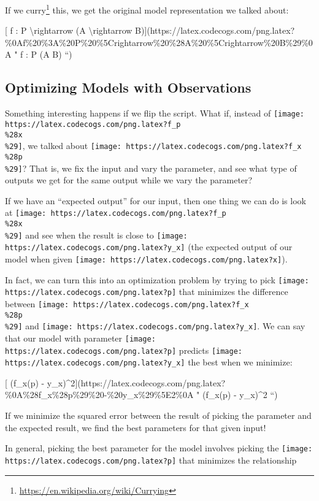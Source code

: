 \documentclass[]{article}
\renewcommand{\href}[2]{#2\footnote{\url{#1}}}
\begin{document}
If we \href{https://en.wikipedia.org/wiki/Currying}{curry} this, we get the
original model representation we talked about:

{[} f : P \textbackslash{}rightarrow (A \textbackslash{}rightarrow
B){]}(https://latex.codecogs.com/png.latex?\%0Af\%20\%3A\%20P\%20\%5Crightarrow\%20\%28A\%20\%5Crightarrow\%20B\%29\%0A
" f : P \rightarrow (A \rightarrow B) ``)

\hypertarget{optimizing-models-with-observations}{%
\subsection{Optimizing Models with
Observations}\label{optimizing-models-with-observations}}

Something interesting happens if we flip the script. What if, instead of
\texttt{[image: https://latex.codecogs.com/png.latex?f\_p\\\%28x\\\%29]}, we talked
about \texttt{[image: https://latex.codecogs.com/png.latex?f\_x\\\%28p\\\%29]}? That
is, we fix the input and vary the parameter, and see what type of outputs we get
for the same output while we vary the parameter?

If we have an ``expected output'' for our input, then one thing we can do is
look at \texttt{[image: https://latex.codecogs.com/png.latex?f\_p\\\%28x\\\%29]} and
see when the result is close to
\texttt{[image: https://latex.codecogs.com/png.latex?y\_x]} (the expected output
of our model when given
\texttt{[image: https://latex.codecogs.com/png.latex?x]}).

In fact, we can turn this into an optimization problem by trying to pick
\texttt{[image: https://latex.codecogs.com/png.latex?p]} that minimizes the
difference between
\texttt{[image: https://latex.codecogs.com/png.latex?f\_x\\\%28p\\\%29]} and
\texttt{[image: https://latex.codecogs.com/png.latex?y\_x]}. We can say that our
model with parameter \texttt{[image: https://latex.codecogs.com/png.latex?p]}
predicts \texttt{[image: https://latex.codecogs.com/png.latex?y\_x]} the best
when we minimize:

{[} (f\_x(p) -
y\_x)\^{}2{]}(https://latex.codecogs.com/png.latex?\%0A\%28f\_x\%28p\%29\%20-\%20y\_x\%29\%5E2\%0A
" (f\_x(p) - y\_x)\^{}2 ``)

If we minimize the squared error between the result of picking the parameter and
the expected result, we find the best parameters for that given input!

In general, picking the best parameter for the model involves picking the
\texttt{[image: https://latex.codecogs.com/png.latex?p]} that minimizes the
relationship
\end{document}
